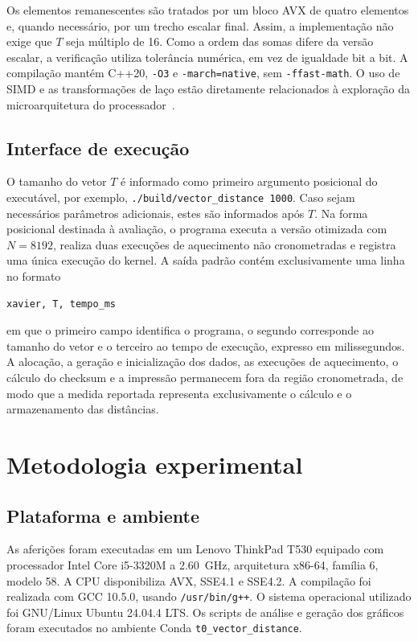 \documentclass[11pt,a4paper]{article}
\begin{document}
Os elementos remanescentes são tratados por um bloco AVX de quatro elementos e, quando necessário, por um trecho escalar final. Assim, a implementação não exige que $T$ seja múltiplo de 16. Como a ordem das somas difere da versão escalar, a verificação utiliza tolerância numérica, em vez de igualdade bit a bit. A compilação mantém C++20, \texttt{-O3} e \texttt{-march=native}, sem \texttt{-ffast-math}. O uso de SIMD e as transformações de laço estão diretamente relacionados à exploração da microarquitetura do processador~\cite{intelOpt2026}.

\subsection{Interface de execução}
O tamanho do vetor $T$ é informado como primeiro argumento posicional do executável, por exemplo, \texttt{./build/vector\_distance 1000}. Caso sejam necessários parâmetros adicionais, estes são informados após $T$. Na forma posicional destinada à avaliação, o programa executa a versão otimizada com $N=8192$, realiza duas execuções de aquecimento não cronometradas e registra uma única execução do kernel. A saída padrão contém exclusivamente uma linha no formato
\begin{lstlisting}[linewidth=0.80\textwidth, xleftmargin=0.20\textwidth]
xavier, T, tempo_ms
\end{lstlisting}
em que o primeiro campo identifica o programa, o segundo corresponde ao tamanho do vetor e o terceiro ao tempo de execução, expresso em milissegundos. A alocação, a geração e inicialização dos dados, as execuções de aquecimento, o cálculo do checksum e a impressão permanecem fora da região cronometrada, de modo que a medida reportada representa exclusivamente o cálculo e o armazenamento das distâncias.

\section{Metodologia experimental}

\subsection{Plataforma e ambiente}
As aferições foram executadas em um Lenovo ThinkPad T530 equipado com processador Intel Core i5-3320M a \SI{2.60}{\giga\hertz}, arquitetura x86-64, família 6, modelo 58. A CPU disponibiliza AVX, SSE4.1 e SSE4.2. A compilação foi realizada com GCC 10.5.0, usando \texttt{/usr/bin/g++}. O sistema operacional utilizado foi GNU/Linux Ubuntu 24.04.4 LTS. Os scripts de análise e geração dos gráficos foram executados no ambiente Conda \texttt{t0\_vector\_distance}.
\end{document}
